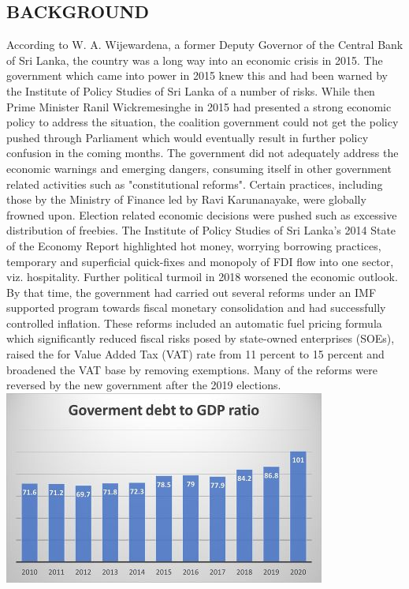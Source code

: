 \documentclass[a4paper,12pt]{article}
\begin{document}
\subsection{BACKGROUND}
According to W. A. Wijewardena, a former Deputy Governor of the Central Bank of Sri Lanka, the country was a long way into an economic crisis in 2015. The government which came into power in 2015 knew this and had been warned by the Institute of Policy Studies of Sri Lanka of a number of risks. While then Prime Minister Ranil Wickremesinghe in 2015 had presented a strong economic policy to address the situation, the coalition government could not get the policy pushed through Parliament which would eventually result in further policy confusion in the coming months. The government did not adequately address the economic warnings and emerging dangers, consuming itself in other government related activities such as "constitutional reforms". Certain practices, including those by the Ministry of Finance led by Ravi Karunanayake, were globally frowned upon. Election related economic decisions were pushed such as excessive distribution of freebies. The Institute of Policy Studies of Sri Lanka's 2014 State of the Economy Report highlighted hot money, worrying borrowing practices, temporary and superficial quick-fixes and monopoly of FDI flow into one sector, viz. hospitality. Further political turmoil in 2018 worsened the economic outlook. By that time, the government had carried out several reforms under an IMF supported program towards fiscal monetary consolidation and had successfully controlled inflation. These reforms included an automatic fuel pricing formula which significantly reduced fiscal risks posed by state-owned enterprises (SOEs), raised the for Value Added Tax (VAT) rate from 11 percent to 15 percent and broadened the VAT base by removing exemptions. Many of the reforms were reversed by the new government after the 2019 elections.\newline
\centering\includegraphics[]{images/Government_debt_to_GDP_ratio.jpg}
\end{document}
